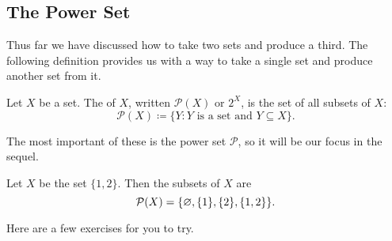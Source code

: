 \documentclass[../notes.tex]{subfiles}
\begin{document}
\subsection{The Power Set}
Thus far we have discussed how to take two sets and produce a third. The following definition provides us with a way to take a single set and produce another set from it.
\begin{definition}
    Let $X$ be a set. The  of $X$, written $\mathcal P(X)$ or $2^X$, is the set of all subsets of $X$:
    \[\mathcal P(X) \coloneqq \{Y: Y \text{ is a set and } Y \subseteq X\}.\]
\end{definition}
The most important of these is the power set $\mathcal P$, so it will be our focus in the sequel.
\begin{example}
    Let $X$ be the set $\{1,2\}$. Then the subsets of $X$ are
    \[\mathcal{P}(X)=\{\varnothing,\{1\},\{2\},\{1,2\}\}.\]
\end{example}
Here are a few exercises for you to try.
\end{document}
